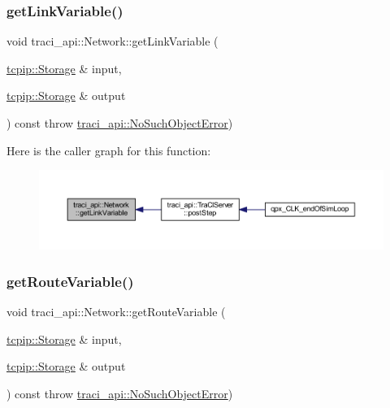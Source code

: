\subsubsection{\texorpdfstring{get\+Link\+Variable()}{getLinkVariable()}}
{\footnotesize\ttfamily void traci\+\_\+api\+::\+Network\+::get\+Link\+Variable (\begin{DoxyParamCaption}\item[{\hyperlink{classtcpip_1_1_storage}{tcpip\+::\+Storage} \&}]{input,  }\item[{\hyperlink{classtcpip_1_1_storage}{tcpip\+::\+Storage} \&}]{output }\end{DoxyParamCaption}) const throw  \hyperlink{classtraci__api_1_1_no_such_object_error}{traci\+\_\+api\+::\+No\+Such\+Object\+Error}) }

Here is the caller graph for this function\+:\nopagebreak
\begin{figure}[H]
\begin{center}
\leavevmode
\includegraphics[width=350pt]{classtraci__api_1_1_network_a8a82aa15b0422ce28ca240e88c1af4f7_icgraph}
\end{center}
\end{figure}
\mbox{\label{classtraci__api_1_1_network_abc0574b41332ec15856e2e5bb9926be9}} 
\subsubsection{\texorpdfstring{get\+Route\+Variable()}{getRouteVariable()}}
{\footnotesize\ttfamily void traci\+\_\+api\+::\+Network\+::get\+Route\+Variable (\begin{DoxyParamCaption}\item[{\hyperlink{classtcpip_1_1_storage}{tcpip\+::\+Storage} \&}]{input,  }\item[{\hyperlink{classtcpip_1_1_storage}{tcpip\+::\+Storage} \&}]{output }\end{DoxyParamCaption}) const throw  \hyperlink{classtraci__api_1_1_no_such_object_error}{traci\+\_\+api\+::\+No\+Such\+Object\+Error}) }


